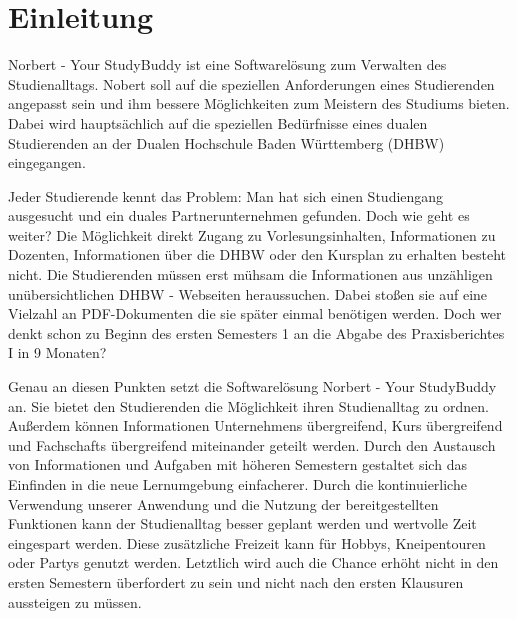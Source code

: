 
\chapter{Einleitung}
Norbert - Your StudyBuddy ist eine Softwarelösung zum Verwalten des Studienalltags. Nobert soll auf die speziellen Anforderungen eines Studierenden angepasst sein und ihm bessere Möglichkeiten zum Meistern des Studiums bieten. Dabei wird hauptsächlich auf die speziellen Bedürfnisse eines dualen Studierenden an der Dualen Hochschule Baden Württemberg (DHBW) eingegangen.

Jeder Studierende kennt das Problem: Man hat sich einen Studiengang ausgesucht und ein duales Partnerunternehmen gefunden. Doch wie geht es weiter? Die Möglichkeit direkt Zugang zu Vorlesungsinhalten, Informationen zu Dozenten, Informationen über die DHBW oder den Kursplan zu erhalten besteht nicht. Die Studierenden müssen erst mühsam die Informationen aus unzähligen unübersichtlichen DHBW - Webseiten heraussuchen. Dabei stoßen sie auf eine Vielzahl an PDF-Dokumenten die sie später einmal benötigen werden. Doch wer denkt schon zu Beginn des ersten Semesters 1 an die Abgabe des Praxisberichtes I in 9 Monaten?

Genau an diesen Punkten setzt die Softwarelösung Norbert - Your StudyBuddy an. Sie bietet den Studierenden die Möglichkeit ihren Studienalltag zu ordnen. Außerdem können Informationen Unternehmens übergreifend, Kurs übergreifend und Fachschafts übergreifend miteinander geteilt werden. Durch den Austausch von Informationen und Aufgaben mit höheren Semestern gestaltet sich das Einfinden in die neue Lernumgebung einfacherer. Durch die kontinuierliche Verwendung unserer Anwendung und die Nutzung der bereitgestellten Funktionen kann der Studienalltag besser geplant werden und wertvolle Zeit eingespart werden. Diese zusätzliche Freizeit kann für Hobbys, Kneipentouren oder Partys genutzt werden. Letztlich wird auch die Chance erhöht nicht in den ersten Semestern überfordert zu sein und nicht nach den ersten Klausuren aussteigen zu müssen. 
